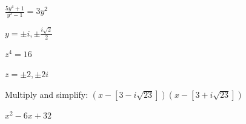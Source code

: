 \documentclass{ximera}
\begin{document}
\begin{question}
\begin{problem}
$\frac{5y^4 + 1}{y^2-1} = 3y^2$

\begin{solution}
$y = \pm i, \pm \frac{i\sqrt{2}}{2}$ 
\end{solution}
\end{problem}

\begin{problem} \label{solvecomplexlast}
$z^{4} = 16$ 

\begin{solution}
$z = \pm 2, \pm 2i$ 
\end{solution}
\end{problem} 

\end{question}


\begin{problem}
Multiply and simplify:  $\left(x - [3 - i\sqrt{23}]\right)\left(x - [3+i\sqrt{23}]\right)$

\begin{solution}
 $x^2 - 6x + 32$
\end{solution}

\end{problem}
\end{document}
